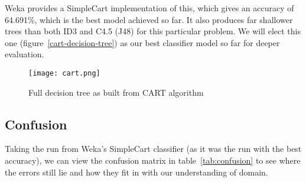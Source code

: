 \documentclass[11pt,a4paper]{article}
\begin{document}
Weka provides a SimpleCart
implementation of this, which gives an accuracy of 64.691\%, which is the best
model achieved so far. It also produces far shallower trees than both ID3
and C4.5 (J48) for this particular problem. We will elect this one
(figure~\ref{cart-decision-tree}) as our best
classifier model so far for deeper evaluation.

\begin{sidewaysfigure}
  \centering
  \texttt{[image: cart.png]}
  \label{fig:cart-decision-tree}
  \caption{Full decision tree as built from CART algorithm}
\end{sidewaysfigure}

\subsection{Confusion}

Taking the run from Weka's SimpleCart classifier (as it was the run with the 
best accuracy), we can view the confusion matrix in table~\ref{tab:confusion}
to see where the errors still lie and how they fit in with our understanding of domain.
\end{document}

